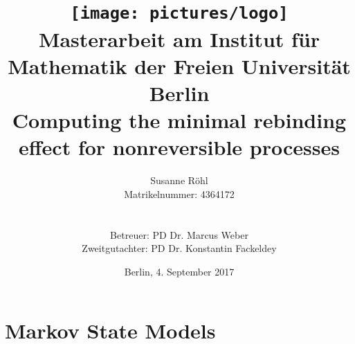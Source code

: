 \documentclass[
  11pt,
  a4paper,
  pdftex,
  twoside,
  DIVcalc,
  openright
  ] {scrreprt}
\title{\texttt{[image: pictures/logo]}\\
{\normalsize Masterarbeit am Institut f\"ur Mathematik der Freien Universit\"at Berlin}\\[4ex]
Computing the minimal rebinding effect for nonreversible processes}
\author{Susanne R\"ohl\\
{\normalsize Matrikelnummer: 4364172}\\
{\normalsize \mailto{susanne.roehl@fu-berlin.de}}\\\\
{\normalsize Betreuer: PD Dr. Marcus Weber} \\
{\normalsize Zweitgutachter: PD Dr. Konstantin Fackeldey}}
\date{Berlin, 4. September 2017}
\begin{document}
\begin{titlepage}

\maketitle
\thispagestyle{empty}

\end{titlepage}

\thispagestyle{empty}
\cleardoublepage{}

 \newpage
 
 
 
\tableofcontents\large
\cleardoublepage{} \normalsize


\nocite{*}


%  
% 
    
    \cleardoublepage
    

\chapter{Markov State Models}\label{chap:markov}
  
  
  
  

\end{document}
